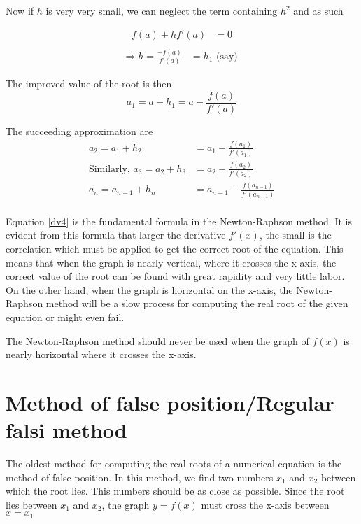 \documentclass[11pt, a4paper]{article}
\begin{document}
Now if $h$ is very very small, we can neglect the term containing $h^2$ and as such

\begin{align*}
  f(a)+hf'(a) &= 0\\
\end{align*}
\vskip-40pt
\begin{align}\label{dv4}
  \Rightarrow h=\frac{-f(a)}{f'(a)} &= h_1\text{ (say) }
\end{align}

The improved value of the root is then
$$
a_1=a+h_1=a-\frac{f(a)}{f'(a)}
$$

The succeeding approximation are 
\begin{align*}
  a_2=a_1+h_2 &= a_1-\frac{f(a_1)}{f'(a_1)}\\
  \text{Similarly, } a_3=a_2+h_3 &= a_2-\frac{f(a_2)}{f'(a_2)}\\
  a_{n}=a_{n-1}+h_n &= a_{n-1}-\frac{f(a_{n-1})}{f'(a_{n-1})}\\
\end{align*}

Equation \ref{dv4} is the fundamental formula in the Newton-Raphson method. It is evident from this formula that larger the derivative $f'(x)$, the small is the correlation which must be applied to get the correct root of the equation. This means that when the graph is nearly vertical, where it crosses the x-axis, the correct value of the root can be found with great rapidity and very little labor. On the other hand, when the graph is horizontal on the x-axis, the Newton-Raphson method will be a slow process for computing the real root of the given equation or might even fail.

The Newton-Raphson method should never be used when the graph of $f(x)$ is nearly horizontal where it crosses the x-axis.

\section{Method of false position/Regular falsi method}
The oldest method for computing the real roots of a numerical equation is the method of false position. In this method, we find two numbers $x_1$ and $x_2$ between which the root lies. This numbers should be as close as possible. Since the root lies between $x_1$ and $x_2$, the graph $y=f(x)$ must
cross the x-axis between $x=x_1$
\end{document}

